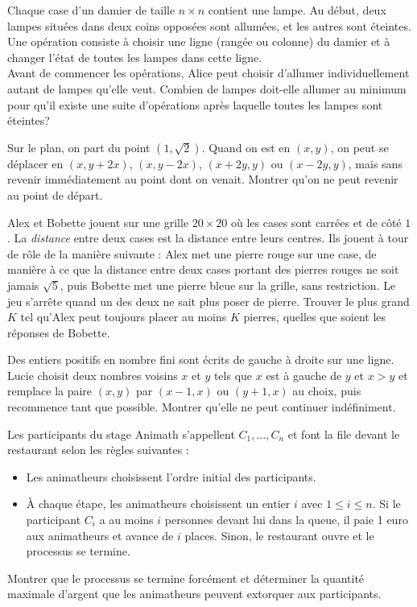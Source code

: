 \begin{exo}
Chaque case d'un damier de taille $n\times n$ contient une lampe. Au début, deux lampes situées dans deux coins opposées sont allumées, et les autres sont éteintes. Une opération consiste à choisir une ligne (rangée ou colonne) du damier et à changer l'état de toutes les lampes dans cette ligne.\\
Avant de commencer les opérations, Alice peut choisir d'allumer individuellement autant de lampes qu'elle veut. Combien de lampes doit-elle allumer au minimum pour qu'il existe une suite d'opérations après laquelle toutes les lampes sont éteintes?
\end{exo}

\begin{exo}
Sur le plan, on part du point $(1,\sqrt2)$. Quand on est en $(x,y)$, on peut se déplacer en $(x,y+2x)$, $(x,y-2x)$, $(x+2y,y)$ ou $(x-2y,y)$, mais sans revenir immédiatement au point dont on venait. Montrer qu'on ne peut revenir au point de départ.
\end{exo}

\begin{exo}
Alex et Bobette jouent sur une grille $20\times20$ où les cases sont carrées et de côté $1$. La \emph{distance} entre deux cases est la distance entre leurs centres. Ils jouent à tour de rôle de la manière suivante : Alex met une pierre rouge sur une case, de manière à ce que la distance entre deux cases portant des pierres rouges ne soit jamais $\sqrt5$, puis Bobette met une pierre bleue sur la grille, sans restriction. Le jeu s'arrête quand un des deux ne sait plus poser de pierre. Trouver le plus grand $K$ tel qu'Alex peut toujours placer au moins $K$ pierres, quelles que soient les réponses de Bobette.
\end{exo}


\begin{exo}
Des entiers positifs en nombre fini sont écrits de gauche à droite sur une ligne. Lucie choisit deux nombres voisins $x$ et $y$ tels que $x$ est à gauche de $y$ et $x>y$ et remplace la paire $(x,y)$ par $(x-1,x)$ ou $(y+1,x)$ au choix, puis recommence tant que possible. Montrer qu'elle ne peut continuer indéfiniment.
\end{exo}


\begin{exo}
Les participants du stage Animath s'appellent $C_1,\ldots,C_n$ et font la file devant le restaurant selon les règles suivantes :
\begin{itemize}
\item
Les animatheurs choisissent l'ordre initial des participants.
\item
À chaque étape, les animatheurs choisissent un entier $i$ avec $1\leq i\leq n$. Si le participant $C_i$ a au moins $i$ personnes devant lui dans la queue, il paie 1 euro aux animatheurs et avance de $i$ places. Sinon, le restaurant ouvre et le processus se termine.
\end{itemize}
Montrer que le processus se termine forcément et déterminer la quantité maximale d'argent que les animatheurs peuvent extorquer aux participants.
\end{exo}

